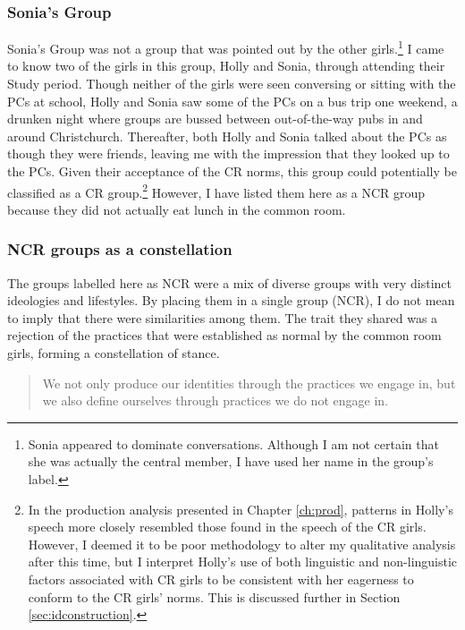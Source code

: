 

\subsubsection{Sonia's Group}

Sonia's Group was not a group that was pointed out by the other girls.\footnote{Sonia appeared to dominate conversations.  Although I am not certain that she was actually the central member, I have used her name in the group's label.}  I came to know two of the girls in this group, Holly and Sonia, through attending their Study period.  Though neither of the girls were seen conversing or sitting with the PCs at school, Holly and Sonia saw some of the PCs on a bus trip one weekend, a drunken night where groups are bussed between out-of-the-way pubs in and around Christchurch.  Thereafter, both Holly and Sonia talked about the PCs as though they were friends, leaving me with the impression that they looked up to the PCs.  Given their acceptance of the CR norms, this group could potentially be classified as a CR group.\footnote{In the production analysis presented in Chapter \ref{ch:prod}, patterns in Holly's speech more closely resembled those found in the speech of the CR girls.  However, I deemed it to be poor methodology to alter my qualitative analysis after this time,  but I interpret Holly's use of both linguistic and non-linguistic factors associated with CR girls to be consistent with her eagerness to conform to the CR girls' norms.  This is discussed further in Section \ref{sec:idconstruction}.}  However, I have listed them here as a NCR group because they did not actually eat lunch in the common room.

\subsubsection{NCR groups as a constellation}

The groups labelled here as NCR were a mix of diverse groups with very distinct ideologies and lifestyles.  By placing them in a single group (NCR), I do not mean to imply that there were similarities among them.  The trait they shared was a rejection of the practices that were established as normal by the common room girls, forming a constellation of stance.

\begin{quote}
	We not only produce our identities through the practices we engage in, but we also define ourselves through practices we do not engage in. \cite[164]{wenger1998}
\end{quote}

